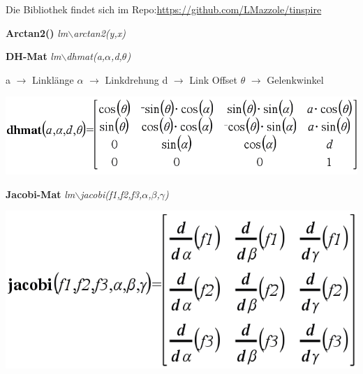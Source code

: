\begin{minipage}{0.6\linewidth}
    \vspace{-1cm}
    Die Bibliothek findet sich im Repo:\newline \href{LMazzole/tinspire}{https://github.com/LMazzole/tinspire}
    
    \hrulefill
    
    \textbf{Arctan2()} \hfill \textit{lm$\backslash$arctan2(y,x)} \hspace{4.5cm}
    
    \hrulefill
    
    \textbf{DH-Mat}\hfill 
    \textit{lm$\backslash$dhmat(a,$\alpha$,d,$\theta$)} \hspace{4cm}
    \begin{multicols}{2}
        a $\rightarrow$ Linklänge \newline
        $\alpha$ $\rightarrow$ Linkdrehung\newline
        d $\rightarrow$ Link Offset\newline
        $\theta$ $\rightarrow$ Gelenkwinkel
    \end{multicols}
    \begin{center}
        \includegraphics[width=0.7\linewidth]{./bilder/dhmat}
    \end{center} \vspace{-\baselineskip}
    \hrulefill
    
    \textbf{Jacobi-Mat} \hfill \textit{lm$\backslash$jacobi(f1,f2,f3,$\alpha$,$\beta$,$\gamma$)}\hspace{3.8cm}
    
    \begin{center}
    \includegraphics[width=0.6\linewidth]{./bilder/jacobi}
    \end{center}   \vspace{-\baselineskip}
    \hrulefill
\end{minipage}
